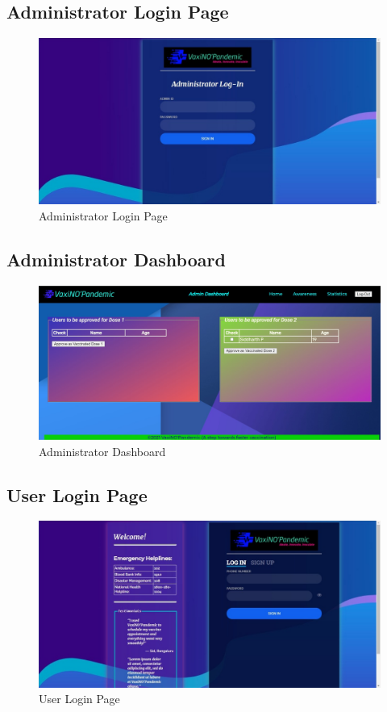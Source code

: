 \documentclass{article}
\begin{document}
    \subsection{Administrator Login Page}
        \begin{figure}[hbt]
            \centering
            \includegraphics[scale=0.3]{adminlogin.jpeg}
            \caption{Administrator Login Page}
            \label{fig:adminlogin}
        \end{figure}
    \newpage
    \subsection{Administrator Dashboard}
        \begin{figure}[hbt]
            \centering
            \includegraphics[scale=0.40682]{admindash.jpg}
            \caption{Administrator Dashboard}
            \label{fig:admindash}
        \end{figure}
    \subsection{User Login Page}
        \begin{figure}[hbt]
            \centering
            \includegraphics[scale=0.32]{userlogin.jpeg}
            \caption{User Login Page}
            \label{fig:userlogin}
        \end{figure}
    \newpage
\end{document}
